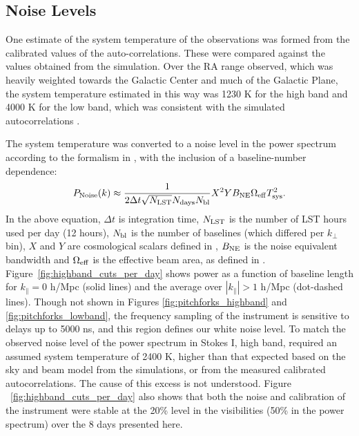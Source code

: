 \documentclass[twocolumn, trackchanges]{aastex61}
\newcommand{\edited}[1]{{\bf \color{blue} #1}}
\begin{document}
{\subsection{Noise Levels}
\label{sec:Noise}

One estimate of the system temperature of the observations was formed from the calibrated values of the auto-correlations.  These were compared against the values obtained from the simulation.  Over the RA range observed, which was heavily weighted towards 
the Galactic Center and much of the Galactic Plane, the system temperature estimated in this way was 1230 K for the high band and 4000 K for the low band, which was consistent with the simulated autocorrelations \citep[][also see the public \href{http://reionization.org/wp-content/uploads/2017/04/HERA19_Tsys_3April2017.pdf}{\edited{\underline{HERA Memo \#16}}}]{deBoer17}.

The system temperature was converted to a noise level in the power spectrum according to the formalism in \cite{Parsons.12a}, with the inclusion of a baseline-number dependence:
\begin{equation}
P_{\rm Noise}(k) \approx \frac{1}{2\Delta t \sqrt{N_{\rm LST}} N_{\rm days} N_{\rm bl}} X^2 Y B_{\rm NE} \Omega_{\rm eff} T_{\rm sys}^2.
\end{equation}
In the above equation, $\Delta t$ is integration time, $N_{\rm LST}$ is the number of LST hours used per day (12 hours), $N_{\rm bl}$ is the number of baselines (which differed per $k_{\perp}$ bin), $X$ and $Y$ are cosmological scalars defined in \cite{Parsons.12a}, $B_{\rm NE}$ is the noise equivalent bandwidth and $\Omega_{\rm eff}$ is the effective beam area, as defined in \cite{Parsons14}.  Figure~\ref{fig:highband_cuts_per_day} shows power as a function of baseline length for $k_{\parallel}=0$ h/Mpc (solid lines) and the average over 
$|k_{\parallel}|>1$ h/Mpc (dot-dashed lines).  Though not shown in Figures \ref{fig:pitchforks_highband} and \ref{fig:pitchforks_lowband}, the frequency sampling of the instrument is sensitive to delays up to 5000 ns, and this region defines our white noise level.
To match the observed noise level of the power spectrum in Stokes I, high band, required an assumed system temperature of 2400 K, higher than that expected based on the sky and beam model from the simulations, or from the measured calibrated autocorrelations.  The cause of this excess is not understood.
Figure ~\ref{fig:highband_cuts_per_day} also shows that both the noise and calibration of the instrument were stable at the 20\% level in the visibilities (50\% in the power spectrum) over the 8 days presented here.  

}
\end{document}
